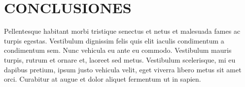 \chapter{CONCLUSIONES}

Pellentesque habitant morbi tristique senectus et netus et malesuada fames ac turpis egestas. Vestibulum dignissim felis quis elit iaculis condimentum a condimentum sem. Nunc vehicula eu ante eu commodo. Vestibulum mauris turpis, rutrum et ornare et, laoreet sed metus. Vestibulum scelerisque, mi eu dapibus pretium, ipsum justo vehicula velit, eget viverra libero metus sit amet orci. Curabitur at augue et dolor aliquet fermentum ut in sapien.